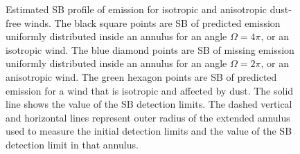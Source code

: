 \documentclass[twocolumn]{aastex61}
\begin{document}
\begin{figure}[h]
\centering
{}
\caption{Estimated SB profile of  emission for isotropic and anisotropic dust-free winds. The black square points are SB of predicted  emission uniformly distributed inside an annulus for an angle $\Omega=4\pi$, or an isotropic wind. The blue diamond points are SB of missing  emission uniformly distributed inside an annulus for an angle $\Omega=2\pi$, or an anisotropic wind. The green hexagon points are SB of predicted emission for a wind that is isotropic and affected by dust. The solid line shows the value of the SB detection limits. The dashed vertical and horizontal lines represent outer radius of the extended annulus used to measure the initial detection limits and the value of the SB detection limit in that annulus.}
\label{fig.emission}
\end{figure}




\end{document}
